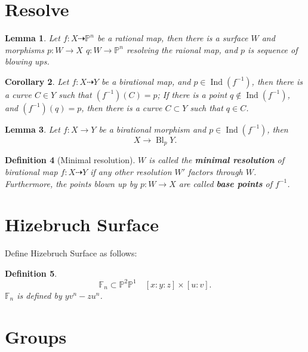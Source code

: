 \documentclass{article}
\newtheorem{defn}{Definition}[section]
\newtheorem{lem}[defn]{Lemma}
\newtheorem{cor}[defn]{Corollary}
\begin{document}
\section{Resolve}
\begin{lem}
  Let $f:X\dashrightarrow \mathbb{P}^{n}$ be a rational map, then there is a surface $W$ and morphisms $p:W\to X$ $q:W\to \mathbb{P}^{n}$ resolving the raional map, and $p$ is sequence of blowing ups.
\end{lem}
\begin{cor}
  Let $f:X\dashrightarrow Y$ be a birational map, and $p\in \operatorname{Ind}(f^{-1})$, then there is a curve $C \in Y$ such that $(f^{-1})(C)=p$; If there is a point $q\notin \operatorname{Ind}(f^{-1})$, and $(f^{-1})(q)=p$, then there is a curve $C \subset Y$ such that $q\in C$.
\end{cor}
\begin{lem}
  Let $f:X\to Y$ be a birational morphism and $p\in \operatorname{Ind}(f^{-1})$, then
  \[
    X\to \operatorname{Bl}_pY
  .\]
\end{lem}
\begin{defn}[Minimal resolution]
  $W$ is called the \textbf{minimal resolution} of birational map $f:X\dashrightarrow Y$ if any other resolution $W'$ factors through $W$.
  Furthermore, the points blown up by $p:W\to X$ are called \textbf{base points} of $f^{-1}$. 
\end{defn}
\section{Hizebruch Surface}
Define Hizebruch Surface as follows:
\begin{defn}
 \[
   \mathbb{F}_{n}\subset \mathbb{P}^{2}\mathbb{P}^{1}\quad [x:y:z]\times [u:v]
 .\]
 $\mathbb{F}_{n}$ is defined by $yv^n-zu^n$.
\end{defn}
\section{Groups}
\end{document}
